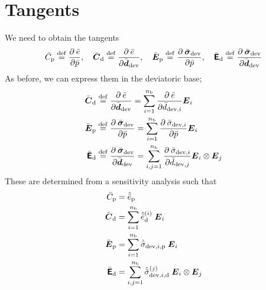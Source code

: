 \documentclass[a4paper]{article}
\newcommand{\dep}{\mathrm{p}}
\newcommand{\ded}{\mathrm{d}}
\begin{document}
\section*{Tangents}
We need to obtain the tangents
\begin{align}
 \bar{    C}_\dep \defeq \pd{\bar{e}}{\bar{p}}, \quad
 \bar{\ts C}_\ded \defeq \pd{\bar{e}}{\bar{\ts d}_\dev}, \quad
 \bar{\ts E}_\dep \defeq \pd{\bar{\ts\sigma}_\dev}{\bar{p}}, \quad
 \bar{\tf E}_\ded \defeq \pd{\bar{\ts\sigma}_\dev}{\bar{\ts d}_\dev}
\end{align}
As before, we can express them in the deviatoric base;
\begin{align}
 \bar{\ts C}_\ded \defeq \;&\pd{\bar{e}}{\bar{\ts d}_\dev} = \sum_{i=1}^{n_\mathrm{b}} \pd{\bar{e}}{\bar{d}_{\dev,i}} \ts E_i\\
 \bar{\ts E}_\dep \defeq \;&\pd{\bar{\ts\sigma}_\dev}{\bar{p}} = \sum_{i=1}^{n_\mathrm{b}} \pd{\bar{\sigma}_{\dev,i}}{\bar{p}} \ts E_i\\
 \bar{\tf E}_\ded \defeq \;&\pd{\bar{\ts\sigma}_\dev}{\bar{\ts d}_\dev} =  \sum_{i,j=1}^{n_\mathrm{b}} \pd{\bar{\sigma}_{\dev,i}}{\bar{d}_{\dev,j}} \ts E_i \outerp \ts E_j
\end{align}
These are determined from a sensitivity analysis such that
\begin{align}
 \bar{    C}_\dep &= \hat{\bar{e}}_{\dep}\\
 \bar{\ts C}_\ded &= \sum_{i=1}^{n_\mathrm{b}} \hat{\bar{e}}_{\ded}^{(i)}\;\ts E_i\\
 \bar{\ts E}_\dep &= \sum_{i=1}^{n_\mathrm{b}} \hat{\bar{\sigma}}_{\dev,i,\dep}\;\ts E_i\\
 \bar{\tf E}_\ded &= \sum_{i,j=1}^{n_\mathrm{b}} \hat{\bar{\sigma}}_{\dev,i,\ded}^{(j)}\;\ts E_i \outerp \ts E_j
\end{align}
\end{document}
